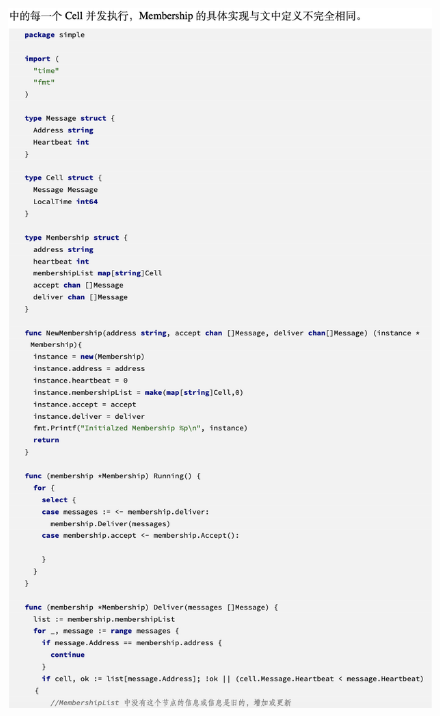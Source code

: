  \begin{figure}[!htbp]
    \small
    \centering
    \includegraphics[width=14cm]{../figures/code/4.png}
 \end{figure}

